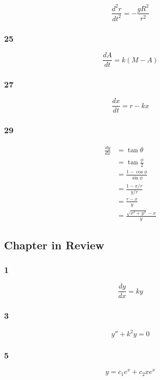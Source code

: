\documentclass{article}
\begin{document}
\[\frac{d^2 r}{d t^2} = -\frac{g R^2}{r^2}\]

\subsubsection{25}

\[\frac{d A}{d t} = k (M - A)\]

\subsubsection{27}

\[\frac{d x}{d t} = r - k x\]

\subsubsection{29}

\begin{align*}
  \frac{d y}{d x} & = \tan \theta                     \\
                  & = \tan \frac{\phi}{2}             \\
                  & = \frac{1 - \cos \phi}{\sin \phi} \\
                  & = \frac{1 - x / r}{y / r}         \\
                  & = \frac{r - x}{y}                 \\
                  & = \frac{\sqrt{x^2 + y^2} - x}{y}
\end{align*}

\subsection{Chapter in Review}

\subsubsection{1}

\[\frac{d y}{d x} = k y\]

\subsubsection{3}

\[y'' + k^2 y = 0\]

\subsubsection{5}

\[y = c_1 e^x + c_2 x e^x\]
\end{document}
